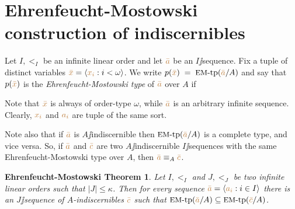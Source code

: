 \documentclass[creche.tex]{subfiles}
\begin{document}
\section{Ehrenfeucht-Mostowski construction of indiscernibles}\label{EM}

Let $I,<_I$ be an infinite linear order and let ${\color{brown}\bar a}$ be an $I\jj$sequence.
Fix a tuple of distinct variables ${\color{brown}\bar x}=\langle{\color{brown}x_i}: i<\omega\rangle$.
We write \emph{$p({\color{brown}\bar x})\;=\;\textrm{{\small EM}-tp}({\color{brown}\bar a}/A)$} and say that $p({\color{brown}\bar x})$ is the \emph{Ehren\-feucht-Mostowski type\/} of ${\color{brown}\bar a}$ over $A$ if


Note that ${\color{brown}\bar x}$ is always of order-type $\omega$,
while ${\color{brown}\bar a}$ is an arbitrary infinite sequence.
Clearly,
${\color{brown} x_i}$ and  ${\color{brown} a_i}$ are tuple of the same sort.

Note also that if ${\color{brown}\bar a}$ is $A\jj$indiscernible then $\textrm{{\small EM}\mbox{-}tp}({\color{brown}\bar a}/A)$ is a complete type,
and vice versa.
So,
if ${\color{brown}\bar a}$ and ${\color{brown}\bar c}$ are two $A\jj$indiscernible $I\jj$sequences with the same Ehren\-feucht-Mostowski type over $A$,
then ${\color{brown}\bar a}\equiv_A {\color{brown}\bar c}$.

\theoremstyle{mio}
\newtheorem{EhrenfeuchtMostowski}[thm]{Ehrenfeucht-Mostowski Theorem}
\begin{EhrenfeuchtMostowski}\label{thm_EM}
Let $I,<_I$ and $J,<_J$ be two infinite linear orders such that $|J|\le \kappa$.
Then for every sequence ${\color{brown}\bar a}=\langle{\color{brown}a_i}:i\in I\rangle$ there is an $J\jj$sequence of $A$-indiscernibles ${\color{brown}\bar c}$ such that $\textrm{{\small EM}\mbox{-}tp}({\color{brown}\bar a}/A)\subseteq\textrm{{\small EM}\mbox{-}tp}({\color{brown}\bar c}/A)$.
\end{EhrenfeuchtMostowski}
\end{document}
